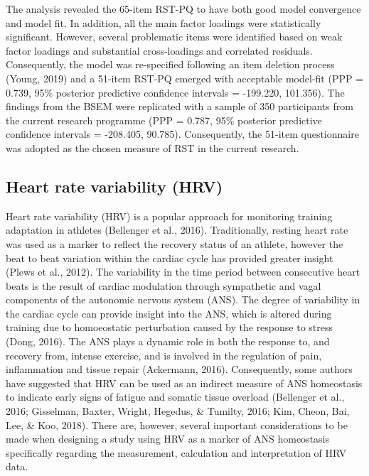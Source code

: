\documentclass[man,floatsintext]{apa6}
\begin{document}
The analysis revealed the 65-item RST-PQ to have both good model convergence and model fit. In addition, all the main factor loadings were statistically significant.
However, several problematic items were identified based on weak factor loadings and substantial cross-loadings and correlated residuals.
Consequently, the model was re-specified following an item deletion process (Young, 2019) and a 51-item RST-PQ emerged with acceptable model-fit (PPP = 0.739, 95\% posterior predictive confidence intervals = -199.220, 101.356).
The findings from the BSEM were replicated with a sample of 350 participants from the current research programme (PPP = 0.787, 95\% posterior predictive confidence intervals = -208.405, 90.785).
Consequently, the 51-item questionnaire was adopted as the chosen measure of RST in the current research.

\hypertarget{heart-rate-variability-hrv}{%
\subsection{Heart rate variability (HRV)}\label{heart-rate-variability-hrv}}

Heart rate variability (HRV) is a popular approach for monitoring training adaptation in athletes (Bellenger et al., 2016).
Traditionally, resting heart rate was used as a marker to reflect the recovery status of an athlete, however the beat to beat variation within the cardiac cycle has provided greater insight (Plews et al., 2012).
The variability in the time period between consecutive heart beats is the result of cardiac modulation through sympathetic and vagal components of the autonomic nervous system (ANS).
The degree of variability in the cardiac cycle can provide insight into the ANS, which is altered during training due to homoeostatic perturbation caused by the response to stress (Dong, 2016).
The ANS plays a dynamic role in both the response to, and recovery from, intense exercise, and is involved in the regulation of pain, inflammation and tissue repair (Ackermann, 2016).
Consequently, some authors have suggested that HRV can be used as an indirect measure of ANS homeostasis to indicate early signs of fatigue and somatic tissue overload (Bellenger et al., 2016; Gisselman, Baxter, Wright, Hegedus, \& Tumilty, 2016; Kim, Cheon, Bai, Lee, \& Koo, 2018).
There are, however, several important considerations to be made when designing a study using HRV as a marker of ANS homeostasis specifically regarding the measurement, calculation and interpretation of HRV data.
\end{document}
